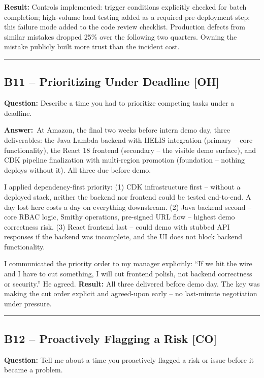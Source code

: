 \documentclass[letterpaper,10pt]{article}
\newlength{\boxwidth}
\newcommand{\bquestionbox}[1]{%
  \vspace{6pt}%
  \noindent\colorbox{bqbg}{%
    \begin{minipage}{\boxwidth}%
      \vspace{3pt}\textbf{\textcolor{orange!70!black}{Question:}} #1\vspace{3pt}%
    \end{minipage}%
  }\vspace{2pt}%
}
\newcommand{\answerlabel}{\noindent\textbf{\textcolor{answerblue}{Answer:}}~}
\begin{document}
\textbf{Result:} Controls implemented: trigger conditions explicitly checked for batch completion; high-volume load testing added as a required pre-deployment step; this failure mode added to the code review checklist. Production defects from similar mistakes dropped 25\% over the following two quarters. Owning the mistake publicly built more trust than the incident cost.

\rule{\linewidth}{0.2pt}

\subsection*{B11 -- Prioritizing Under Deadline \textmd{[OH]}}

\bquestionbox{Describe a time you had to prioritize competing tasks under a deadline.}

\answerlabel At Amazon, the final two weeks before intern demo day, three deliverables: the Java Lambda backend with HELIS integration (primary -- core functionality), the React 18 frontend (secondary -- the visible demo surface), and CDK pipeline finalization with multi-region promotion (foundation -- nothing deploys without it). All three due before demo.

I applied dependency-first priority: (1) CDK infrastructure first -- without a deployed stack, neither the backend nor frontend could be tested end-to-end. A day lost here costs a day on everything downstream. (2) Java backend second -- core RBAC logic, Smithy operations, pre-signed URL flow -- highest demo correctness risk. (3) React frontend last -- could demo with stubbed API responses if the backend was incomplete, and the UI does not block backend functionality.

I communicated the priority order to my manager explicitly: ``If we hit the wire and I have to cut something, I will cut frontend polish, not backend correctness or security.'' He agreed. \textbf{Result:} All three delivered before demo day. The key was making the cut order explicit and agreed-upon early -- no last-minute negotiation under pressure.

\rule{\linewidth}{0.2pt}

\subsection*{B12 -- Proactively Flagging a Risk \textmd{[CO]}}

\bquestionbox{Tell me about a time you proactively flagged a risk or issue before it became a problem.}
\end{document}
